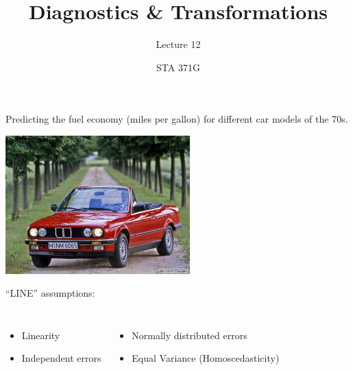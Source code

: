 \documentclass{beamer}\usepackage[]{graphicx}\usepackage[]{color}
\title{Diagnostics \& Transformations}
\subtitle{Lecture 12}
\author{STA 371G}
\begin{document}
  
  

  \frame{\maketitle}



  \begin{darkframes}
    
    
    \begin{frame}
      \fontsize{9}{9}\selectfont
      Predicting the fuel economy (miles per gallon) for different car models of the 70s.
      
      \begin{center}
        \includegraphics[width=2.8in]{bmw} \\
      \end{center} \pause
      
      ``LINE'' assumptions:
      \begin{columns}[onlytextwidth]
          \begin{itemize}
            \item Linearity
            \item Independent errors
          \end{itemize}
          \begin{itemize}
            \item Normally distributed errors
            \item Equal Variance (Homoscedasticity)
          \end{itemize}
      \end{columns}
    \end{frame}
    

\end{darkframes}
\end{document}
